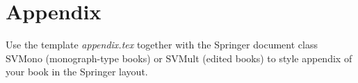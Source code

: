 %
%
%

\appendix
\chapter{Appendix}
\label{introA} %

Use the template \emph{appendix.tex} together with the Springer document class SVMono (monograph-type books) or SVMult (edited books) to style appendix of your book in the Springer layout.







